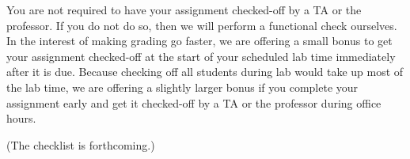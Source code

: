 You are not required to have your assignment checked-off by a TA or the professor.
If you do not do so, then we will perform a functional check ourselves.
In the interest of making grading go faster, we are offering a small bonus to get your assignment checked-off at the start of your scheduled lab time immediately after it is due.
Because checking off all students during lab would take up most of the lab time, we are offering a slightly larger bonus if you complete your assignment early and get it checked-off by a TA or the professor during office hours.

(The checklist is forthcoming.)

%
